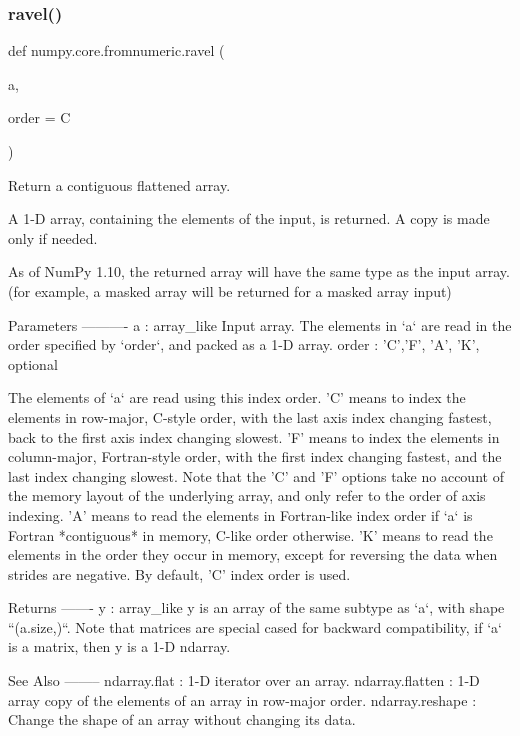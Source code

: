\subsubsection{\texorpdfstring{ravel()}{ravel()}}
{\footnotesize\ttfamily def numpy.\+core.\+fromnumeric.\+ravel (\begin{DoxyParamCaption}\item[{}]{a,  }\item[{}]{order = {\ttfamily \textquotesingle{}C\textquotesingle{}} }\end{DoxyParamCaption})}

\begin{DoxyVerb}Return a contiguous flattened array.

A 1-D array, containing the elements of the input, is returned.  A copy is
made only if needed.

As of NumPy 1.10, the returned array will have the same type as the input
array. (for example, a masked array will be returned for a masked array
input)

Parameters
----------
a : array_like
    Input array.  The elements in `a` are read in the order specified by
    `order`, and packed as a 1-D array.
order : {'C','F', 'A', 'K'}, optional

    The elements of `a` are read using this index order. 'C' means
    to index the elements in row-major, C-style order,
    with the last axis index changing fastest, back to the first
    axis index changing slowest.  'F' means to index the elements
    in column-major, Fortran-style order, with the
    first index changing fastest, and the last index changing
    slowest. Note that the 'C' and 'F' options take no account of
    the memory layout of the underlying array, and only refer to
    the order of axis indexing.  'A' means to read the elements in
    Fortran-like index order if `a` is Fortran *contiguous* in
    memory, C-like order otherwise.  'K' means to read the
    elements in the order they occur in memory, except for
    reversing the data when strides are negative.  By default, 'C'
    index order is used.

Returns
-------
y : array_like
    y is an array of the same subtype as `a`, with shape ``(a.size,)``.
    Note that matrices are special cased for backward compatibility, if `a`
    is a matrix, then y is a 1-D ndarray.

See Also
--------
ndarray.flat : 1-D iterator over an array.
ndarray.flatten : 1-D array copy of the elements of an array
                  in row-major order.
ndarray.reshape : Change the shape of an array without changing its data.


\end{DoxyVerb}
